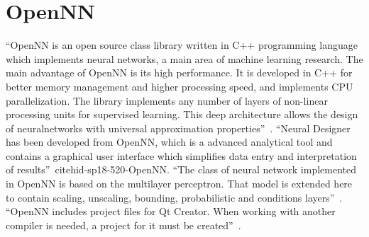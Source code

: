 \section{OpenNN}

“OpenNN is an open source class library written in C++ programming language
which implements neural networks, a main area of machine learning research.
The main advantage of OpenNN is its high performance. It is developed in 
C++ for better memory management and higher processing speed, and 
implements CPU parallelization. The library implements any number of layers
of non-linear processing units for supervised learning. This deep 
architecture allows the design of neuralnetworks with universal approximation
properties”~\cite{hid-sp18-520-OpenNN}.
“Neural Designer has been developed from OpenNN, which is a advanced analytical
tool and contains a graphical user interface which simplifies data entry
and interpretation of results”~cite{hid-sp18-520-OpenNN}.
“The class of neural network implemented in OpenNN is based on the multilayer 
perceptron. That model is extended here to contain scaling, unscaling, bounding,
probabilistic and conditions layers”~\cite{hid-sp18-520-OpenNNn}.
“OpenNN includes project files for Qt Creator. When working with another compiler
is needed, a project for it must be created”~\cite{hid-sp18-520-OpenNNb}. 

